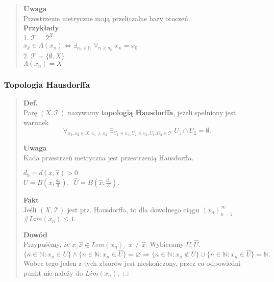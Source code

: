 \documentclass[10pt,a4paper]{article}
\begin{document}
{\begin{quote}
    \textbf{Uwaga}\\
    Przestrzenie metryczne mają przeliczalne bazy otoczeń.\\

    \textbf{Przykłady}\\
    1. $\mathcal{T} = 2^X$ \\
    $x_k \in \Lambda(x_n) \iff \exists_{n_0 \in \mathbb{N}} \; \forall_{n \geq n_0} \; x_n = x_0$ \\
    2. $\mathcal{T} = \{\emptyset, X\}$ \\
    $\Lambda(x_n) = X$\\
    \end{quote}

    \subsubsection*{Topologia Hausdorffa}
    \begin{quote}
    \textbf{Def.}\\
    Parę $(X, \mathcal{T})$ nazywamy \textbf{topologią Hausdorffa}, jeżeli spełniony jest warunek \\
    $$\forall_{x_1, x_2 \in X, x_1 \neq x_2} \; \exists_{U_1 \ni x_1, U_2 \ni x_2, U_1, U_2 \in \mathcal{T}} \; U_1 \cap U_2 = \emptyset.$$

    \textbf{Uwaga}\\
    Kada przestrzeń metryczna jest przestrzenią Hausdorffa.
    \begin{tcolorbox}[mybox]
    \( d_0 = d(x, \hat{x}) > 0 \)\\
    \( U = B(x, \tfrac{d_0}{3}), \;\; \hat{U} = B(\hat{x}, \tfrac{d_0}{3}). \)
    \end{tcolorbox}

    \textbf{Fakt}\\
    Jeśli \( (X, \mathcal{T}) \) jest prz. Hausdorffa, to dla dowolnego ciągu \( (x_n)_{n=1}^\infty \)
    \(
    \# Lim (x_n) \le 1.
    \)
    \begin{tcolorbox}[mybox]
    \textbf{Dowód}\\
    Przypuśćmy, że \( x, \hat{x} \in Lim (x_n),\; x \ne \hat{x}. \) Wybieramy \( U, \hat{U}. \)\\
    \[
    \{ n \in \mathbb{N} : x_n \in U \} \wedge \{ n \in \mathbb{N} : x_n \in \hat{U} \} = \varnothing \Rightarrow
    \{ n \in \mathbb{N} : x_n \notin U \} \cup \{ n \in \mathbb{N} : x_n \in \hat{U} \} = \mathbb{N}.
    \]
    Wobec tego jeden z tych zbiorów jest nieskończony, przez co odpowiedni punkt nie należy do \( Lim (x_n). \;\Box \)
    \end{tcolorbox}
    \end{quote}
}
\end{document}
